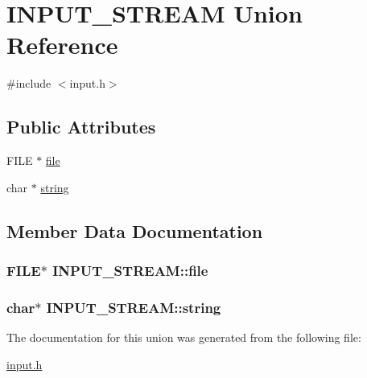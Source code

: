 \hypertarget{unionINPUT__STREAM}{}\section{I\+N\+P\+U\+T\+\_\+\+S\+T\+R\+E\+AM Union Reference}
\label{unionINPUT__STREAM}


{\ttfamily \#include $<$input.\+h$>$}

\subsection*{Public Attributes}
\begin{DoxyCompactItemize}
\item 
F\+I\+LE $\ast$ \hyperlink{unionINPUT__STREAM_a02312e1206f0dd33c3644d2747d1202e}{file}
\item 
char $\ast$ \hyperlink{unionINPUT__STREAM_a02a1e6b34a44e0b7b56257f1ca176bdb}{string}
\end{DoxyCompactItemize}


\subsection{Member Data Documentation}
\subsubsection[{\texorpdfstring{file}{file}}]{\setlength{\rightskip}{0pt plus 5cm}F\+I\+LE$\ast$ I\+N\+P\+U\+T\+\_\+\+S\+T\+R\+E\+A\+M\+::file}\hypertarget{unionINPUT__STREAM_a02312e1206f0dd33c3644d2747d1202e}{}\label{unionINPUT__STREAM_a02312e1206f0dd33c3644d2747d1202e}
\subsubsection[{\texorpdfstring{string}{string}}]{\setlength{\rightskip}{0pt plus 5cm}char$\ast$ I\+N\+P\+U\+T\+\_\+\+S\+T\+R\+E\+A\+M\+::string}\hypertarget{unionINPUT__STREAM_a02a1e6b34a44e0b7b56257f1ca176bdb}{}\label{unionINPUT__STREAM_a02a1e6b34a44e0b7b56257f1ca176bdb}


The documentation for this union was generated from the following file\+:\begin{DoxyCompactItemize}
\item 
\hyperlink{input_8h}{input.\+h}\end{DoxyCompactItemize}

